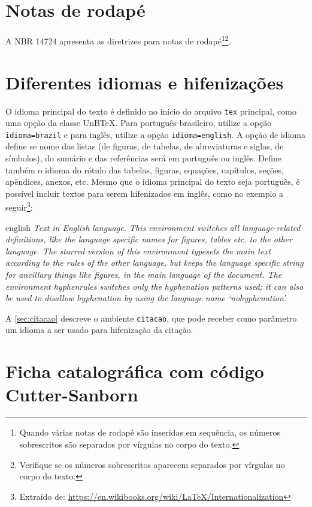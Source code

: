 \section{Notas de rodapé}

A NBR 14724 \cite[p. 10]{NBR14724:2024} apresenta as diretrizes para notas de rodapé\footnote{Quando várias notas de rodapé são inseridas em sequência, os números sobrescritos são separados por vírgulas no corpo do texto.}\footnote{Verifique se os números sobrescritos aparecem separados por vírgulas no corpo do texto.}.

\section{Diferentes idiomas e hifenizações}
\label{sec:hifenizacao}

O idioma principal do texto é definido no início do arquivo \texttt{tex} principal, como uma opção da classe UnB\TeX. Para português-brasileiro, utilize a opção \texttt{idioma=brazil} e para inglês, utilize a opção \texttt{idioma=english}. A opção de idioma define se nome das listas (de figuras, de tabelas, de abreviaturas e siglas, de símbolos), do sumário e das referências será em português ou inglês. Define também o idioma do rótulo das tabelas, figuras, equações, capítulos, seções, apêndices, anexos, etc. Mesmo que o idioma principal do texto seja português, é possível incluir textos para serem hifenizados em inglês, como no exemplo a seguir\footnote{Extraído de: \url{https://en.wikibooks.org/wiki/LaTeX/Internationalization}}:

\begin{otherlanguage*}{english}
\textit{Text in English language. This environment switches all language-related definitions, like the language specific names for figures, tables etc. to the other language. The starred version of this environment typesets the main text according to the rules of the other language, but keeps the language specific string for ancillary things like figures, in the main language of the document. The environment hyphenrules switches only the hyphenation patterns used; it can also be used to disallow hyphenation by using the language name `nohyphenation'.}
\end{otherlanguage*}

A \cref{sec:citacao} descreve o ambiente \texttt{citacao}, que pode receber como parâmetro um idioma a ser usado para hifenização da citação.

\section{Ficha catalográfica com código Cutter-Sanborn}

